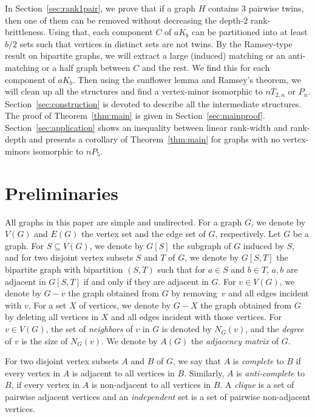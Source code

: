 \documentclass[11pt]{article}
\begin{document}
	In Section~\ref{sec:rank1pair}, we prove that if a graph $H$ contains $3$
        pairwise twins, then
        one of them can be removed without decreasing the depth-$2$ rank-brittleness.
        Using that, each component $C$ of $aK_b$ can be partitioned into
        at least $b/2$ sets such that vertices in distinct sets are not twins.
	By the Ramsey-type result on bipartite graphs,
        we will extract a large (induced) matching or an anti-matching or a half graph between 
	$C$ and the rest. We find this for each component of $aK_b$.
        Then using the sunflower lemma and Ramsey's theorem,
        we will clean up all the structures and find a vertex-minor isomorphic to $nT_{2,n}$ or $P_n$.
	Section~\ref{sec:construction} is devoted to describe all the intermediate structures.
	The proof of Theorem~\ref{thm:main} is given in Section~\ref{sec:mainproof}.
        Section~\ref{sec:application} shows an inequality between linear rank-width and rank-depth and presents a corollary of Theorem~\ref{thm:main} for graphs with no vertex-minors isomorphic to $nP_5$.
			
		\section{Preliminaries}\label{sec:prelim}
		
		All graphs in this paper are simple and undirected. 
		For a graph $G$, we denote by $V(G)$ and $E(G)$ the vertex set and the edge set of $G$, respectively. 
		Let $G$ be a graph.
	For $S\subseteq V(G)$, we denote by $G[S]$ the subgraph of $G$ induced by $S$, and  
	for two disjoint vertex subsets $S$ and $T$ of $G$, 
	we denote by $G[S,T]$ the bipartite graph with bipartition $(S,T)$ such that 
	for $a\in S$ and $b\in T$, $a,b$ are adjacent in $G[S,T]$ if and only if they are adjacent in $G$.
  For $v\in V(G)$, we denote by $G- v$ the graph obtained from $G$ by removing~$v$ and all edges incident with $v$.
  For a set $X$ of vertices, we denote by $G-X$ the graph obtained from $G$ by deleting all vertices in $X$ and all edges incident with those vertices.
	For $v\in V(G)$, the set of \emph{neighbors} of $v$ in $G$ is denoted by $N_G(v)$, and the \emph{degree} of $v$ is the size of $N_G(v)$.
	We denote by $A(G)$ the \emph{adjacency matrix} of $G$.
	
	For two disjoint vertex subsets $A$ and $B$ of $G$, 
	we say that $A$ is \emph{complete} to $B$ if
        every vertex in $A$ is adjacent to all vertices in $B$.
	Similarly, $A$ is \emph{anti-complete} to $B$, if
        every vertex in $A$ is non-adjacent to all vertices in $B$.
        A \emph{clique} is a set of pairwise adjacent vertices
        and an \emph{independent} set is a set of pairwise non-adjacent vertices.
        
\end{document}
